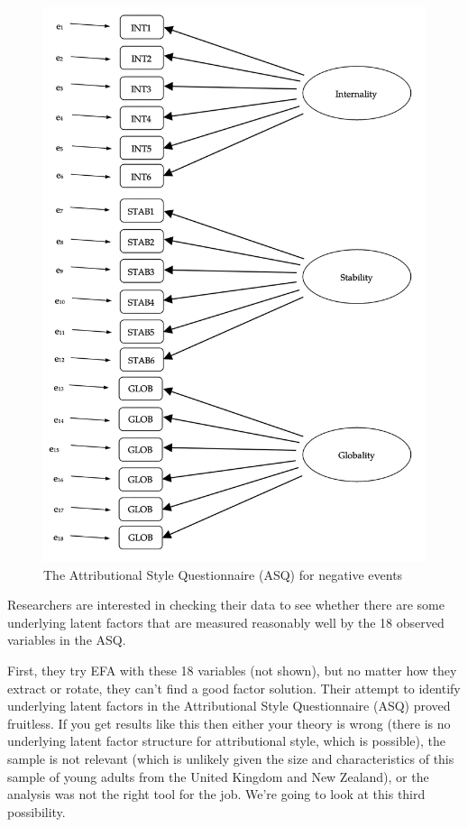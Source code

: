\documentclass[
  a4paper,
]{book}
\begin{document}
\begin{figure}

\includegraphics[width=1\textwidth,height=\textheight]{images/fig15-20.png} \hfill{}

\caption{\label{fig-fig15-20}The Attributional Style Questionnaire (ASQ)
for negative events}

\end{figure}

Researchers are interested in checking their data to see whether there
are some underlying latent factors that are measured reasonably well by
the 18 observed variables in the ASQ.

First, they try EFA with these 18 variables (not shown), but no matter
how they extract or rotate, they can't find a good factor solution.
Their attempt to identify underlying latent factors in the Attributional
Style Questionnaire (ASQ) proved fruitless. If you get results like this
then either your theory is wrong (there is no underlying latent factor
structure for attributional style, which is possible), the sample is not
relevant (which is unlikely given the size and characteristics of this
sample of young adults from the United Kingdom and New Zealand), or the
analysis was not the right tool for the job. We're going to look at this
third possibility.
\end{document}

